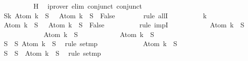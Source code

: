 \begin{isabellebody}
\ \ \ \ \ \ \ \ \isamarkupfalse%
\ H\ \isamarkupfalse%
\ {\isacharparenleft}iprover\ elim{\isacharcolon}\ conjunct{}\ conjunct{}{\isacharparenright}\isanewline
\ \ \ \ \ \ \isamarkupfalse%
\ S{}{\isacharcolon}{\isachardoublequoteopen}{\isasymforall}k{\isachardot}\ Atom\ k\ {\isasymin}\ S{\isacharprime}\ {\isasymlongrightarrow}\ \isactrlbold {\isasymnot}\ {\isacharparenleft}Atom\ k{\isacharparenright}\ {\isasymin}\ S{\isacharprime}\ {\isasymlongrightarrow}\ False{\isachardoublequoteclose}\isanewline
\ \ \ \ \ \ \isamarkupfalse%
\ {\isacharparenleft}rule\ allI{\isacharparenright}\isanewline
\ \ \ \ \ \ \ \ \isamarkupfalse%
\ k\isanewline
\ \ \ \ \ \ \ \ \isamarkupfalse%
\ {\isachardoublequoteopen}Atom\ k\ {\isasymin}\ S{\isacharprime}\ {\isasymlongrightarrow}\ \isactrlbold {\isasymnot}\ {\isacharparenleft}Atom\ k{\isacharparenright}\ {\isasymin}\ S{\isacharprime}\ {\isasymlongrightarrow}\ False{\isachardoublequoteclose}\isanewline
\ \ \ \ \ \ \ \ \isamarkupfalse%
\ {\isacharparenleft}rule\ impI{\isacharparenright}{\isacharplus}\isanewline
\ \ \ \ \ \ \ \ \ \ \isamarkupfalse%
\ {\isachardoublequoteopen}Atom\ k\ {\isasymin}\ S{\isacharprime}{\isachardoublequoteclose}\isanewline
\ \ \ \ \ \ \ \ \ \ \isamarkupfalse%
\ {\isachardoublequoteopen}\isactrlbold {\isasymnot}\ {\isacharparenleft}Atom\ k{\isacharparenright}\ {\isasymin}\ S{\isacharprime}{\isachardoublequoteclose}\isanewline
\ \ \ \ \ \ \ \ \ \ \isamarkupfalse%
\ {\isachardoublequoteopen}Atom\ k\ {\isasymin}\ S{\isachardoublequoteclose}\ \isanewline
\ \ \ \ \ \ \ \ \ \ \ \ \isamarkupfalse%
\ {\isacartoucheopen}S{\isacharprime}\ {\isasymsubseteq}\ S{\isacartoucheclose}\ {\isacartoucheopen}Atom\ k\ {\isasymin}\ S{\isacharprime}{\isacartoucheclose}\ \isamarkupfalse%
\ {\isacharparenleft}rule\ set{\isacharunderscore}mp{\isacharparenright}\isanewline
\ \ \ \ \ \ \ \ \ \ \isamarkupfalse%
\ {\isachardoublequoteopen}\isactrlbold {\isasymnot}\ {\isacharparenleft}Atom\ k{\isacharparenright}\ {\isasymin}\ S{\isachardoublequoteclose}\isanewline
\ \ \ \ \ \ \ \ \ \ \ \ \isamarkupfalse%
\ {\isacartoucheopen}S{\isacharprime}\ {\isasymsubseteq}\ S{\isacartoucheclose}\ {\isacartoucheopen}\isactrlbold {\isasymnot}\ {\isacharparenleft}Atom\ k{\isacharparenright}\ {\isasymin}\ S{\isacharprime}{\isacartoucheclose}\ \isamarkupfalse%
\ {\isacharparenleft}rule\ set{\isacharunderscore}mp{\isacharparenright}\isanewline

\end{isabellebody}
